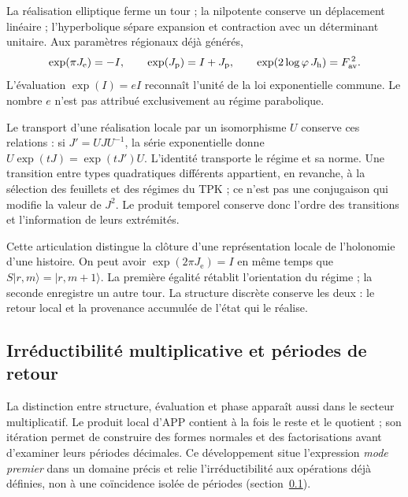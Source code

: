La réalisation elliptique ferme un tour ; la nilpotente conserve un
déplacement linéaire ; l'hyperbolique sépare expansion et contraction avec
un déterminant unitaire. Aux paramètres régionaux déjà générés,
\[
 \exp(\pi J_{\mathrm e})=-I,\qquad
 \exp(J_{\mathrm p})=I+J_{\mathrm p},\qquad
 \exp(2\log\varphi\,J_{\mathrm h})=F_{\rm av}^{\,2}.
\]
L'évaluation \(\exp(I)=eI\) reconnaît l'unité de la loi exponentielle
commune. Le nombre \(e\) n'est pas attribué exclusivement au régime parabolique.

Le transport d'une réalisation locale par un isomorphisme \(U\) conserve
ces relations : si \(J'=UJU^{-1}\), la série exponentielle donne
\(U\exp(tJ)=\exp(tJ')U\). L'identité transporte le régime et sa
norme. Une transition entre types quadratiques différents appartient, en
revanche, à la sélection des feuillets et des régimes du TPK ; ce n'est pas une conjugaison
qui modifie la valeur de \(J^2\). Le produit temporel conserve donc
l'ordre des transitions et l'information de leurs extrémités.

Cette articulation distingue la clôture d'une représentation locale de
l'holonomie d'une histoire. On peut avoir \(\exp(2\pi J_{\mathrm e})=I\)
en même temps que \(S|r,m\rangle=|r,m+1\rangle\). La première égalité
rétablit l'orientation du régime ; la seconde enregistre un autre tour. La
structure discrète conserve les deux : le retour local et la provenance
accumulée de l'état qui le réalise.




\subsection{Irréductibilité multiplicative et périodes de retour}
\label{x_reciprocidad:primos-retornos}

La distinction entre structure, évaluation et phase apparaît aussi dans le
secteur multiplicatif. Le produit local d’APP contient à la fois le reste
et le quotient ; son itération permet de construire des formes normales et
des factorisations avant d’examiner leurs périodes décimales. Ce développement
situe l’expression \emph{mode premier} dans un domaine précis et relie
l’irréductibilité aux opérations déjà définies, non à une coïncidence
isolée de périodes (section~\ref{x_reciprocidad:primos-retornos}).

